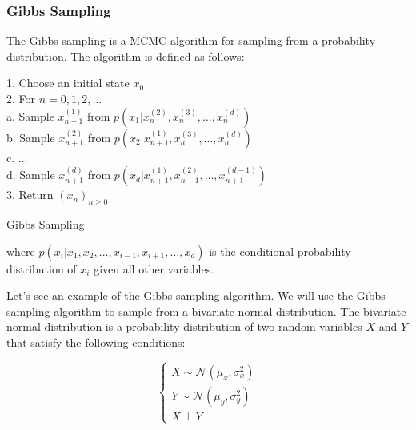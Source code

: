 \documentclass{article}
\begin{document}
\subsubsection{Gibbs Sampling}

The Gibbs sampling is a MCMC algorithm for sampling from a probability distribution. The algorithm is defined as follows:

\begin{center}
	\begin{minipage}{0.7\linewidth} %
		\begin{algorithm}[H]
			1. Choose an initial state $x_0$ \\
			2. For $n = 0, 1, 2, \dots$ \\
			\hspace*{0.5cm} a. Sample $x_{n+1}^{(1)}$ from $p(x_1 | x_n^{(2)}, x_n^{(3)}, \dots, x_n^{(d)})$ \\
			\hspace*{0.5cm} b. Sample $x_{n+1}^{(2)}$ from $p(x_2 | x_{n+1}^{(1)}, x_n^{(3)}, \dots, x_n^{(d)})$ \\
			\hspace*{0.5cm} c. $\dots$ \\
			\hspace*{0.5cm} d. Sample $x_{n+1}^{(d)}$ from $p(x_d | x_{n+1}^{(1)}, x_{n+1}^{(2)}, \dots, x_{n+1}^{(d-1)})$ \\
			3. Return $(x_n)_{n \geq 0}$
			\caption{Gibbs Sampling} %
			\label{alg:Gibbs-Sampling}   %
		\end{algorithm}
	\end{minipage}
\end{center}

where $p(x_i | x_1, x_2, \dots, x_{i-1}, x_{i+1}, \dots, x_d)$ is the conditional probability distribution of $x_i$ given all other variables. 


Let's see an example of the Gibbs sampling algorithm. We will use the Gibbs sampling algorithm to sample from a bivariate normal distribution. The bivariate normal distribution is a probability distribution of two random variables $X$ and $Y$ that satisfy the following conditions:

\[
	\begin{cases}
		X \sim \mathcal{N}(\mu_x, \sigma_x^2) \\
		Y \sim \mathcal{N}(\mu_y, \sigma_y^2) \\
		X \perp Y
	\end{cases}
\]
\end{document}
